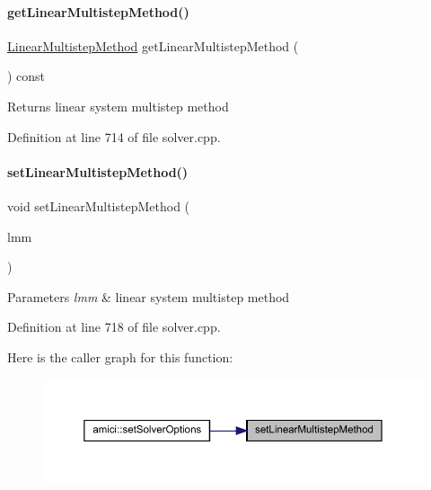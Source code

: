 \paragraph{\texorpdfstring{getLinearMultistepMethod()}{getLinearMultistepMethod()}}
{\footnotesize\ttfamily \mbox{\hyperlink{namespaceamici_a9ebe272482a8e073efe7078b7e96e8bc}{Linear\+Multistep\+Method}} get\+Linear\+Multistep\+Method (\begin{DoxyParamCaption}{ }\end{DoxyParamCaption}) const}

\begin{DoxyReturn}{Returns}
linear system multistep method 
\end{DoxyReturn}


Definition at line 714 of file solver.\+cpp.

\mbox{\label{classamici_1_1_solver_a2143a6f85b81c24611aad5689865953c}} 
\paragraph{\texorpdfstring{setLinearMultistepMethod()}{setLinearMultistepMethod()}}
{\footnotesize\ttfamily void set\+Linear\+Multistep\+Method (\begin{DoxyParamCaption}\item[{\mbox{\hyperlink{namespaceamici_a9ebe272482a8e073efe7078b7e96e8bc}{Linear\+Multistep\+Method}}}]{lmm }\end{DoxyParamCaption})}


\begin{DoxyParams}{Parameters}
{\em lmm} & linear system multistep method \\
\hline
\end{DoxyParams}


Definition at line 718 of file solver.\+cpp.

Here is the caller graph for this function\+:
\nopagebreak
\begin{figure}[H]
\begin{center}
\leavevmode
\includegraphics[width=350pt]{classamici_1_1_solver_a2143a6f85b81c24611aad5689865953c_icgraph}
\end{center}
\end{figure}
\mbox{\label{classamici_1_1_solver_a33883905a8ab056896373d76f18ce683}} 
